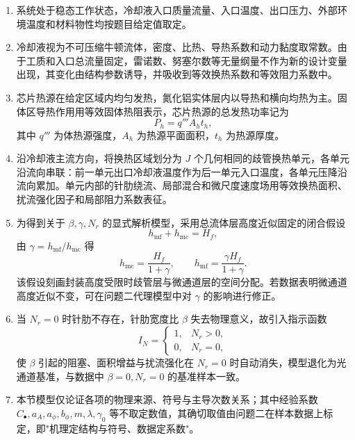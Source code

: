 \documentclass[12pt,a4paper]{ctexart}
\begin{document}
\begin{enumerate}
    \item 系统处于稳态工作状态，冷却液入口质量流量、入口温度、出口压力、外部环境温度和材料物性均按题目给定值取定。

    \item 冷却液视为不可压缩牛顿流体，密度、比热、导热系数和动力黏度取常数。由于工质和入口总流量固定，雷诺数、努塞尔数等无量纲量不作为新的设计变量出现，其变化由结构参数诱导，并吸收到等效换热系数和等效阻力系数中。

    \item 芯片热源在给定区域内均匀发热，氮化铝实体层内以导热和横向均热为主。固体区导热作用用等效固体热阻表示，芯片热源的总发热功率记为
    \begin{equation}
        P_h=q'''A_h t_h ,
    \end{equation}
    其中 $q'''$ 为体热源强度，$A_h$ 为热源平面面积，$t_h$ 为热源厚度。

    \item 沿冷却液主流方向，将换热区域划分为 $J$ 个几何相同的歧管换热单元，各单元沿流向串联：前一单元出口冷却液温度作为后一单元入口温度，各单元压降沿流向累加。单元内部的针肋绕流、局部混合和微尺度速度场用等效换热面积、扰流强化因子和局部阻力系数表征。

    \item 为得到关于 $\beta,\gamma,N_r$ 的显式解析模型，采用总流体层高度近似固定的闭合假设
    \begin{equation}
        h_{\mathrm{mf}}+h_{\mathrm{mc}}=H_f ,
    \end{equation}
    由 $\gamma=h_{\mathrm{mf}}/h_{\mathrm{mc}}$ 得
    \begin{equation}
        h_{\mathrm{mc}}=\frac{H_f}{1+\gamma},\qquad
        h_{\mathrm{mf}}=\frac{\gamma H_f}{1+\gamma}.
    \end{equation}
    该假设刻画封装高度受限时歧管层与微通道层的空间分配。若数据表明微通道高度近似不变，可在问题二代理模型中对 $\gamma$ 的影响进行修正。

    \item 当 $N_r=0$ 时针肋不存在，针肋宽度比 $\beta$ 失去物理意义，故引入指示函数
    \begin{equation}
        I_N=\begin{cases}1,& N_r>0,\\[2pt]0,& N_r=0,\end{cases}
    \end{equation}
    使 $\beta$ 引起的阻塞、面积增益与扰流强化在 $N_r=0$ 时自动消失，模型退化为光通道基准，与数据中 $\beta=0,N_r=0$ 的基准样本一致。

    \item 本节模型仅论证各项的物理来源、符号与主导次数关系；其中经验系数 $C_\bullet,a_A,a_\phi,b_\phi,m,\lambda,\gamma_0$ 等不取定数值，其确切取值由问题二在样本数据上标定，即"机理定结构与符号、数据定系数"。
\end{enumerate}
\end{document}
